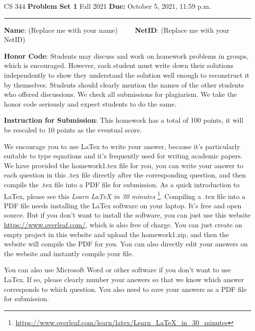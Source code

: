 \documentclass[12pt]{article}
\begin{document}
\noindent
CS 344 \hfill \textbf{Problem Set 1} \newline 
{Fall 2021} \hfill \textbf{Due:} October 5, 2021, 11:59 p.m.

\noindent
\rule{\linewidth}{0.4pt}

\vspace{.5cm}

\textbf{Name}: ({\color{blue}Replace me with your name})~~~~~\textbf{NetID}: ({\color{blue}Replace me with your NetID})

\vspace{.5cm}

\textbf{Honor Code}: Students may discuss and work on homework problems in groups, which is encouraged. However, each student must write down their solutions independently to show they understand the solution well enough to reconstruct it by themselves.  Students should clearly mention the names of the other students who offered discussions. We check all submissions for plagiarism. We take the honor code seriously and expect students to do the same. 


\vspace{.5cm}

\textbf{Instruction for Submission}: This homework has a total of 100 points, it will be rescaled to 10 points as the eventual score. 

We encourage you to use LaTex to write your answer, because it's particularly suitable to type equations and it's frequently used for writing academic papers. We have provided the homework1.tex file for you, you can write your answer to each question in this .tex file directly after the corresponding question, and then compile the .tex file into a PDF file for submission. As a quick introduction to LaTex, please see this \textit{Learn LaTeX in 30 minutes} \footnote{\url{https://www.overleaf.com/learn/latex/Learn_LaTeX_in_30_minutes}}. Compiling a .tex file into a PDF file needs installing the LaTex software on your laptop. It's free and open source. But if you don't want to install the software, you can just use this website \url{https://www.overleaf.com/}, which is also free of charge. You can just create an empty project in this website and upload the homework1.zip, and then the website will compile the PDF for you. You can also directly edit your answers on the website and instantly compile your file.

You can also use Microsoft Word or other software if you don't want to use LaTex. If so, please clearly number your answers so that we know which answer corresponds to which question. You also need to save your answers as a PDF file for submission.
\end{document}
